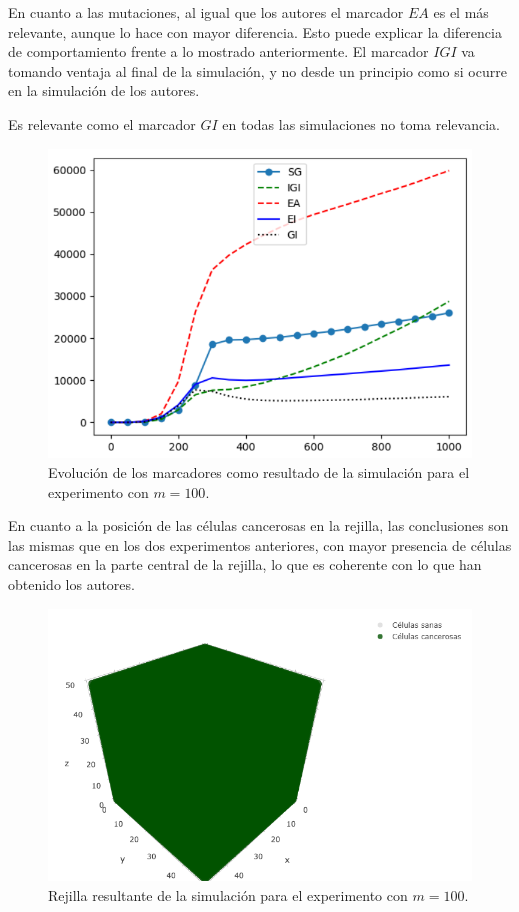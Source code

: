 En cuanto a las mutaciones, al igual que los autores el marcador $EA$ es el más relevante, aunque lo hace
con mayor diferencia. Esto puede explicar la diferencia de comportamiento frente a lo mostrado anteriormente.
El marcador $IGI$ va tomando ventaja al final de la simulación, y no desde un principio como si ocurre en
la simulación de los autores.

Es relevante como el marcador $GI$ en todas las simulaciones no toma relevancia.

\begin{figure}[h]
\centering
\includegraphics[scale=0.8]{figures/experiments/exp3/mutations}
\caption{Evolución de los marcadores como resultado de la simulación para el experimento con $m = 100$.}
\end{figure}

En cuanto a la posición de las células cancerosas en la rejilla, las conclusiones son las mismas
que en los dos experimentos anteriores, con mayor presencia de células cancerosas en la parte central
de la rejilla, lo que es coherente con lo que han obtenido los autores.

\begin{figure}[h]
\centering
\includegraphics[scale=0.6]{figures/experiments/exp3/grid}
\caption{Rejilla resultante de la simulación para el experimento con $m = 100$.}
\end{figure}

